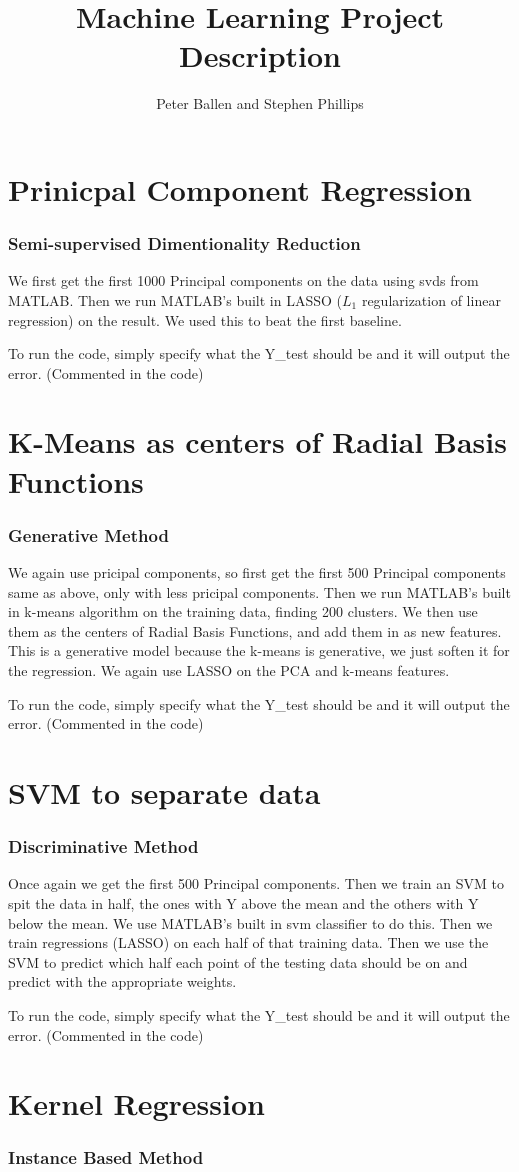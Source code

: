 \documentclass[a4paper,10pt]{article}
\title{Machine Learning Project Description}
\author{Peter Ballen and Stephen Phillips}
\begin{document}
\maketitle

\section{Prinicpal Component Regression}
\subsubsection*{Semi-supervised Dimentionality Reduction}
We first get the first 1000 Principal components on the data using svds from MATLAB.
Then we run MATLAB's built in LASSO ($L_1$ regularization of linear regression) on the result. We used this to beat the first baseline. 

To run the code, simply specify what the Y\_test should be and it will output the error. (Commented in the code)

\section{K-Means as centers of Radial Basis Functions}
\subsubsection*{Generative Method}
We again use pricipal components, so first get the first 500 Principal components same as above, only with less pricipal components.
Then we run MATLAB's built in k-means algorithm on the training data, finding 200 clusters. We then use them as the centers of
Radial Basis Functions, and add them in as new features. This is a generative model because the k-means is generative, we just
soften it for the regression. We again use LASSO on the PCA and k-means features.

To run the code, simply specify what the Y\_test should be and it will output the error. (Commented in the code)

\section{SVM to separate data}
\subsubsection*{Discriminative Method}
Once again we get the first 500 Principal components. Then we train an SVM to spit the data in half, the ones with Y above the mean and the
others with Y below the mean. We use MATLAB's built in svm classifier to do this. Then we train regressions (LASSO) on each half of that training data.
Then we use the SVM to predict which half each point of the testing data should be on and predict with the appropriate weights. 

To run the code, simply specify what the Y\_test should be and it will output the error. (Commented in the code)

\section{Kernel Regression}
\subsubsection*{Instance Based Method}
\end{document}
